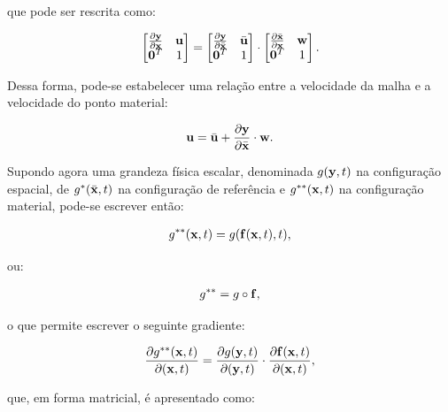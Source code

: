 \noindent que pode ser rescrita como:

\begin{align}
	\begin{bmatrix}
		\frac{\partial {\mathbf{y}}}{\partial {\mathbf{x}}} & \mathbf{u} \\
		\mathbf{0}^T & 1 \\
	\end{bmatrix}
	=
	\begin{bmatrix}
		\frac{\partial {\mathbf{y}}}{\partial {\bar{\mathbf{x}}}} & \bar{\mathbf{u}} \\
		\mathbf{0}^T & 1 \\
	\end{bmatrix}
	\cdot
	\begin{bmatrix}
		\frac{\partial {\bar{\mathbf{x}}}}{\partial {\mathbf{x}}} & \mathbf{w} \\
		\mathbf{0}^T & 1 \\
	\end{bmatrix} .
\end{align}

Dessa forma, pode-se estabelecer uma relação entre a velocidade da malha e a velocidade do ponto material:

\begin{align}
	\mathbf{u} = \bar{\mathbf{u}} + \frac{\partial{\mathbf{y}}}{\partial{\bar{\mathbf{x}}}}\cdot \mathbf{w}. \label{eq:vel_rel_mat_ALE}
\end{align}

Supondo agora uma grandeza física escalar, denominada $g(\mathbf{y},t)$ na configuração espacial, de $g^{*}(\bar{\mathbf{x}},t)$ na configuração de referência e $g^{**}(\mathbf{x},t)$ na configuração material, pode-se escrever então:

\begin{align}
	g^{**}(\mathbf{x},t) = g(\mathbf{f}(\mathbf{x},t),t), 
\end{align}

\noindent ou:

\begin{align}
	g^{**} = g  \circ \mathbf{f},
\end{align}

\noindent o que permite escrever o seguinte gradiente:

\begin{align}
	\frac{\partial g^{**}(\mathbf{x},t)}{\partial (\mathbf{x},t)} = \frac{\partial g(\mathbf{y},t)}{\partial (\mathbf{y},t)} \cdot \frac{\partial \mathbf{f}(\mathbf{x},t)}{\partial (\mathbf{x},t)},
\end{align}

\noindent que, em forma matricial, é apresentado como:

